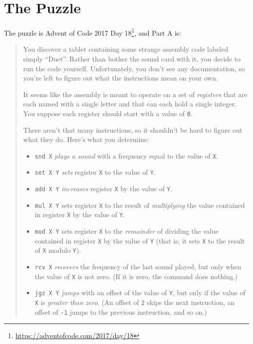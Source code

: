 \documentclass[]{article}
\renewcommand{\href}[2]{#2\footnote{\url{#1}}}
\begin{document}
\hypertarget{the-puzzle}{%
\section{The Puzzle}\label{the-puzzle}}

The puzzle is \href{https://adventofcode.com/2017/day/18}{Advent of Code 2017
Day 18}, and Part A is:

\begin{quote}
You discover a tablet containing some strange assembly code labeled simply
``Duet''. Rather than bother the sound card with it, you decide to run the code
yourself. Unfortunately, you don't see any documentation, so you're left to
figure out what the instructions mean on your own.

It seems like the assembly is meant to operate on a set of \emph{registers} that
are each named with a single letter and that can each hold a single integer. You
suppose each register should start with a value of \texttt{0}.

There aren't that many instructions, so it shouldn't be hard to figure out what
they do. Here's what you determine:

\begin{itemize}
\tightlist
\item
  \texttt{snd\ X} \emph{plays a sound} with a frequency equal to the value of
  \texttt{X}.
\item
  \texttt{set\ X\ Y} \emph{sets} register \texttt{X} to the value of \texttt{Y}.
\item
  \texttt{add\ X\ Y} \emph{increases} register \texttt{X} by the value of
  \texttt{Y}.
\item
  \texttt{mul\ X\ Y} sets register \texttt{X} to the result of
  \emph{multiplying} the value contained in register \texttt{X} by the value of
  \texttt{Y}.
\item
  \texttt{mod\ X\ Y} sets register \texttt{X} to the \emph{remainder} of
  dividing the value contained in register \texttt{X} by the value of \texttt{Y}
  (that is, it sets \texttt{X} to the result of \texttt{X} modulo \texttt{Y}).
\item
  \texttt{rcv\ X} \emph{recovers} the frequency of the last sound played, but
  only when the value of \texttt{X} is not zero. (If it is zero, the command
  does nothing.)
\item
  \texttt{jgz\ X\ Y} \emph{jumps} with an offset of the value of \texttt{Y}, but
  only if the value of \texttt{X} is \emph{greater than zero}. (An offset of
  \texttt{2} skips the next instruction, an offset of \texttt{-1} jumps to the
  previous instruction, and so on.)
\end{itemize}


\end{quote}
\end{document}
